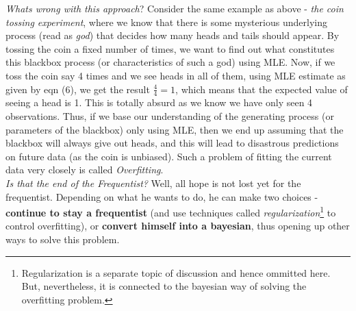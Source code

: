 \documentclass[a4paper]{article}
\begin{document}
\noindent \textit{Whats wrong with this approach}? Consider the same example as above - \textit{the coin tossing experiment}, where we know that there is some mysterious underlying process (read as \textit{god}) that decides how many heads and tails should appear. By tossing the coin a fixed number of times, we want to find out what constitutes this blackbox process (or characteristics of such a god) using MLE. Now, if we toss the coin say 4 times and we see heads in all of them, using MLE estimate as given by eqn (6), we get the result $\frac{4}{4} = 1$, which means that the expected value of seeing a head is 1. This is totally absurd as we know we have only seen 4 observations. Thus, if we base our understanding of the generating process (or parameters of the blackbox) only using MLE, then we end up assuming that the blackbox will always give out heads, and this will lead to disastrous predictions on future data (as the coin is unbiased). Such a problem of fitting the current data very closely is called \textit{Overfitting}. \\

\noindent \textit{Is that the end of the Frequentist?} Well, all hope is not lost yet for the frequentist. Depending on what he wants to do, he can make two choices - \textbf{continue to stay a frequentist} (and use techniques called \textit{regularization}\footnote{Regularization is a separate topic of discussion and hence ommitted here. But, nevertheless, it is connected to the bayesian way of solving the overfitting problem.} to control overfitting), or \textbf{convert himself into a bayesian}, thus opening up other ways to solve this problem. \\



\end{document}
